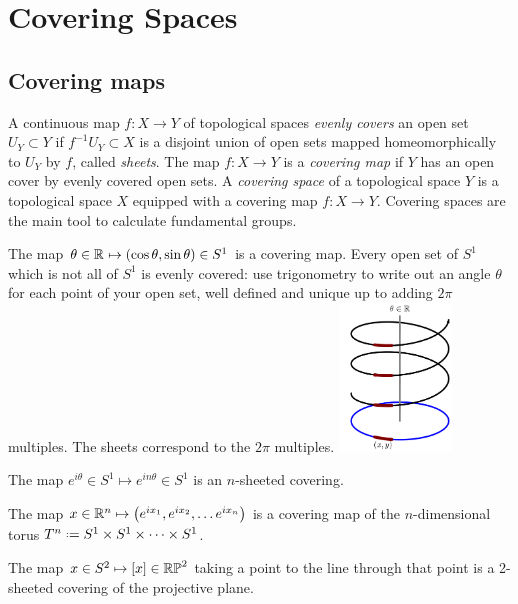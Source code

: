 \chapter{Covering Spaces}\label{chapter:covering.spaces}

\section{Covering maps}
A continuous map \(f \colon X \to Y\) of topological spaces \emph{evenly covers}
an open set \(U_Y \subset Y\) if \(f^{-1}U_Y \subset X\) is a disjoint union of open sets mapped homeomorphically to \(U_Y\) by \(f\), called \emph{sheets}.
The map \(f \colon X \to Y\) is a \emph{covering map} if \(Y\) has an open cover by evenly covered open sets.
A \emph{covering space} of a topological space \(Y\) is a topological space \(X\) equipped with a covering map \(f \colon X \to Y\). 
Covering spaces are the main tool to calculate fundamental groups.
\begin{exampleAndImage}{3cm}
The map \(\theta \in \mathbb{R}^{} \mapsto \left(\cos \theta, \sin \theta\right) \in S^1\) is a covering map.
Every open set of \(S^1\) which is not all of \(S^1\) is evenly covered: use trigonometry to write out an angle \(\theta\) for each point of your open set, well defined and unique up to adding \(2\pi\) multiples.
The sheets correspond to the \(2\pi\) multiples.
\tcblower
\includegraphics[width=3cm]{circle-covering}
\end{exampleAndImage}
\begin{example}
The map \(e^{i \theta} \in S^1 \mapsto e^{i n \theta} \in S^1\) is an \(n\)-sheeted covering.
\end{example}
\begin{example}
The map \(x \in \mathbb{R}^{n} \mapsto \left(e^{ix_1}, e^{ix_2}, \dots e^{ix_n}\right)\) is a covering map of the \(n\)-dimensional torus \(T^n\defeq S^1 \times S^1 \times \dots \times S^1\).
\end{example}
\begin{example}
The map \(x \in S^2 \mapsto [x] \in \mathbb{RP}^{2}\) taking a point to the line through that point is a 2-sheeted covering of the projective plane.
\end{example}
